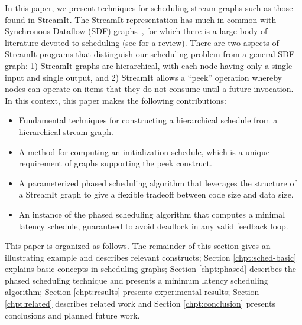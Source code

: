 \documentclass{sig-alt-full}
\begin{document}
In this paper, we present techniques for scheduling stream graphs such
as those found in StreamIt.  The StreamIt representation has much in
common with Synchronous Dataflow (SDF) graphs~\cite{lee87static}, for
which there is a large body of literature devoted to scheduling (see
\cite{bhattacharyya99synthesis} for a review).  There are two aspects
of StreamIt programs that distinguish our scheduling problem from a
general SDF graph: 1) StreamIt graphs are hierarchical, with each node
having only a single input and single output, and 2) StreamIt allows a
``peek'' operation whereby nodes can operate on items that they do not
consume until a future invocation.  In this context, this paper makes
the following contributions:
\begin{itemize}
\item Fundamental techniques for constructing a hierarchical schedule
from a hierarchical stream graph.

\item A method for computing an initialization schedule, which is a
unique requirement of graphs supporting the peek construct.

\item A parameterized phased scheduling algorithm that leverages the
structure of a StreamIt graph to give a flexible tradeoff between code
size and data size.

\item An instance of the phased scheduling algorithm that computes a
minimal latency schedule, guaranteed to avoid deadlock in any valid
feedback loop.
\end{itemize}
This paper is organized as follows.  The remainder of this section
gives an illustrating example and describes relevant {\StreamIt}
constructs; Section \ref{chpt:sched-basic} explains basic concepts in
scheduling {\StreamIt} graphs; Section \ref{chpt:phased} describes the
phased scheduling technique and presents a minimum latency scheduling
algorithm; Section \ref{chpt:results} presents experimental results;
Section \ref{chpt:related} describes related work and Section
\ref{chpt:conclusion} presents conclusions and planned future work.
\end{document}
